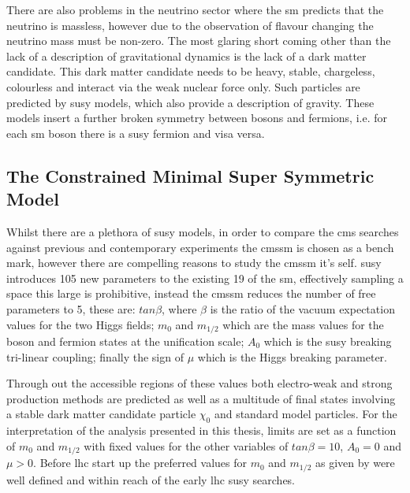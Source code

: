 There are also problems in the neutrino sector where the \ac{sm} predicts that 
the neutrino is massless, however due to the observation of flavour changing 
the neutrino mass must be non-zero.
The most glaring short coming other than the lack of a description of 
gravitational dynamics is the lack of a dark matter candidate. This dark matter 
candidate needs to be heavy, stable, chargeless, colourless and interact via 
the weak nuclear force only. Such particles are predicted by 
\ac{susy}\cite{ref:SUSY-1, ref:SUSY0, ref:SUSY1, ref:SUSY2, ref:SUSY3, 
ref:SUSY4, ref:hierarchy1, ref:hierarchy2} 
models, which also provide a description of gravity. These models insert a 
further broken symmetry between bosons and fermions, i.e. for each \ac{sm} 
boson there is a \ac{susy} fermion and visa versa.



\subsection{The Constrained Minimal Super Symmetric Model} %
\label{sec:the_constrained_minimal_super_symmetric_model}
Whilst there are a plethora of \ac{susy} models, in order to compare the 
\ac{cms} searches against previous and contemporary experiments the 
\ac{cmssm}\cite{ref:CMSSM} is chosen as a bench mark, however there are 
compelling reasons to study the \ac{cmssm} it's self. \ac{susy} introduces 105 
new parameters to the existing 19 of the \ac{sm}, effectively sampling a space 
this large is prohibitive, instead the \ac{cmssm} reduces the number of free 
parameters to 5, these are: $tan \beta$, where $\beta$ is the ratio of the 
vacuum expectation values for the two Higgs fields; $m_{0}$ and $m_{1/2}$ which 
are the mass values for the boson and fermion states at the unification scale; 
$A_{0}$ which is the \ac{susy} breaking tri-linear coupling; finally the sign 
of $\mu$ which is the Higgs breaking parameter.

Through out the accessible regions of these values both electro-weak and strong 
production methods are predicted as well as a multitude of final states 
involving a stable dark matter candidate particle $\chi_{0}$ and standard model 
particles. For the interpretation of the analysis presented in this thesis, 
limits are set as a function of $m_{0}$ and $m_{1/2}$ with fixed values for the 
other variables of $tan \beta = 10$, $A_{0} = 0$ and $\mu > 0$.
Before \ac{lhc} start up the preferred values for $m_{0}$ and $m_{1/2}$ as 
given by \cite{Buchmueller:2011tr} were well defined and within reach of the 
early \ac{lhc} \ac{susy} searches.

